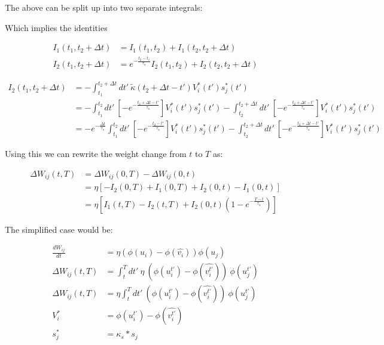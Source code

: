 The above can be split up into two separate integrals:

Which implies the identities

\begin{align}
  I_1(t_1, t_2 + \Delta t) & = I_1 (t_1, t_2) + I_1 (t_2, t_2 + \Delta t)                                       \\
  I_2(t_1, t_2 + \Delta t) & = e^{- \frac{t_2 - t_1}{\tau_{\kappa}}} I_2 (t_1, t_2) + I_2 (t_2, t_2 + \Delta t)
\end{align}


\begin{align}
  I_2 (t_1, t_2 + \Delta t) & = -\int_{t_1}^{t_2 + \Delta t} dt' \ \tilde{\kappa} (t_2 + \Delta t - t') V_i^\ast (t') s_j^\ast (t')                                        \\
                            & = -\int_{t_1}^{t_2} dt' \ \left[ -e^{- \frac{t_2 + \Delta t - t'}{\tau_\kappa}} \right] V_i^\ast (t') s_j^\ast (t')
  -\int_{t_2}^{t_2 + \Delta t} dt' \ \left[ -e^{- \frac{t_2 + \Delta t - t'}{\tau_\kappa}} \right] V_i^\ast (t') s_j^\ast (t')                                             \\
                            & = -e^{- \frac{ \Delta t}{\tau_\kappa}} \int_{t_1}^{t_2} dt' \ \left[ -e^{- \frac{t_2 - t'}{\tau_\kappa}} \right] V_i^\ast (t') s_j^\ast (t')
  -\int_{t_2}^{t_2 + \Delta t} dt' \ \left[ -e^{- \frac{t_2 + \Delta t - t'}{\tau_\kappa}} \right] V_i^\ast (t') s_j^\ast (t')
\end{align}


Using this we can rewrite the weight change from $t$ to $T$ as:


\begin{align}
  \Delta W_{ij}(t,T) & = \Delta W_{ij}(0,T) - \Delta W_{ij}(0,t)                                               \\
                     & = \eta [-I_2(0,T) + I_1(0,T) + I_2(0,t) - I_1(0,t)]                                     \\
                     & = \eta [I_1(t,T) - I_2(t,T) + I_2(0,t)\left( 1 - e^{- \frac{T-t}{\tau_\kappa}} \right)]
\end{align}

The simplified \cite{sacramento2018dendritic} case would be:

\begin{align}
  \frac{dW_{ij}}{dt} & = \eta (\phi(u_i) - \phi(\hat{v_i})) \phi(u_j)                                         \\
  \Delta W_{ij}(t,T) & = \int_t^T dt' \ \eta \  (\phi(u_i^{t'}) - \phi(\widehat{v_i^{t'}})) \  \phi(u_j^{t'}) \\
  \Delta W_{ij}(t,T) & = \eta \int_t^T dt' \  (\phi(u_i^{t'}) - \phi(\widehat{v_i^{t'}})) \ \phi(u_j^{t'})    \\
  V_i^*              & = \phi(u_i^{t'}) - \phi(\widehat{v_i^{t'}})                                            \\
  s_j^*              & = \kappa_s * s_j
\end{align}


